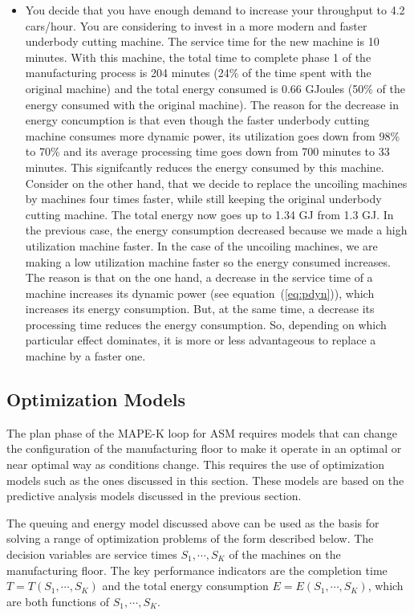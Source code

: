 \documentclass[a4paper, 12pt]{article} %
\begin{document}
\begin{itemize}
\item You decide that you have enough demand to increase your throughput to 4.2 cars/hour. You are considering to invest in a more modern and faster underbody cutting machine. The service time for the new machine is 10 minutes. With this machine, the total time to complete phase 1 of the manufacturing process is 204 minutes (24\% of the time spent with the original machine) and the total energy consumed is 0.66 GJoules (50\% of the energy consumed with the original machine). The reason for the decrease in energy concumption is that even though the faster underbody cutting  machine consumes more dynamic power, its utilization goes down from 98\% to 70\% and its average processing time goes down from 700 minutes to 33 minutes. This signifcantly reduces the energy consumed by this machine. Consider on the other hand, that we decide to replace the uncoiling machines by machines four times faster, while still keeping the original underbody cutting machine. The total energy now goes up to 1.34 GJ from 1.3 GJ. In the previous case, the energy consumption decreased because we made a high utilization machine faster. In the case of the uncoiling machines,  we are making a low utilization machine faster so the energy consumed increases. The reason is that on the one hand, a decrease in the service time of a machine increases its dynamic power  (see equation~(\ref{eq:pdyn})), which increases its energy consumption. But,  at the same time, a decrease its processing time reduces the energy consumption. So, depending on which particular effect dominates, it is more or less advantageous to replace a machine by a faster one. 

\end{itemize}




\subsection{Optimization Models} \label{sec:opt}

The plan phase of the MAPE-K loop for ASM requires models that can change the configuration of the manufacturing floor to make it operate in an optimal or near optimal way as conditions change. This requires the use of optimization
models such as the ones discussed in this section. These models are based on the predictive analysis models discussed in the previous section.

The queuing and energy model discussed above can be used as the basis for solving a range of optimization problems of the form described below. The decision variables are service times $S_1, \cdots, S_K$ of the machines on the manufacturing floor. The key performance indicators are the completion time $T = T (S_1, \cdots, S_K)$ and the total energy consumption $E = E (S_1, \cdots, S_K)$, which are both functions of $S_1, \cdots, S_K$.
\end{document}
